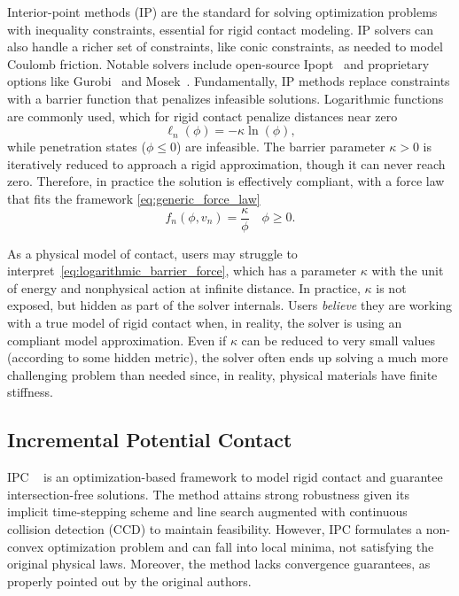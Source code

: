 Interior-point methods (IP) are the standard for solving optimization problems
with inequality constraints, essential for rigid contact modeling. IP solvers
can also handle a richer set of constraints, like conic constraints, as needed
to model Coulomb friction. Notable solvers include open-source
Ipopt~\cite{bib:wachter2006} and proprietary options like
Gurobi~\cite{bib:gurobi} and Mosek~\cite{bib:mosek}. Fundamentally, IP methods
replace constraints with a barrier function that penalizes infeasible solutions.
Logarithmic functions are commonly used, which for rigid contact penalize
distances near zero
\begin{equation*}
    \ell_n(\phi) = -\kappa \ln(\phi),
\end{equation*}
while penetration states ($\phi\le0$) are infeasible. The barrier parameter
$\kappa > 0$ is iteratively reduced to approach a rigid approximation, though it
can never reach zero. Therefore, in practice the solution is effectively
compliant, with a force law that fits the framework
\eqref{eq:generic_force_law}
\begin{equation}
    f_n(\phi, v_n) = \frac{\kappa}{\phi}\quad  \phi \ge 0.
    \label{eq:logarithmic_barrier_force}
\end{equation}

As a physical model of contact, users may struggle to
interpret~\eqref{eq:logarithmic_barrier_force}, which has a parameter $\kappa$
with the unit of energy and nonphysical action at infinite distance. In
practice, $\kappa$ is not exposed, but hidden as part of the solver internals.
Users \emph{believe} they are working with a true model of rigid contact when,
in reality, the solver is using an compliant model approximation. Even if
$\kappa$ can be reduced to very small values (according to some hidden metric),
the solver often ends up solving a much more challenging problem than needed
since, in reality, physical materials have finite stiffness.

\subsection{Incremental Potential Contact}

IPC ~\cite{bib:li2020ipc} is an optimization-based framework to model rigid
contact and guarantee intersection-free solutions. The method attains strong
robustness given its implicit time-stepping scheme and line
search augmented with continuous collision detection (CCD) to maintain
feasibility. However, IPC formulates a non-convex optimization problem and can
fall into local minima, not satisfying the original physical laws. Moreover, the
method lacks convergence guarantees, as properly pointed out by the original
authors.

